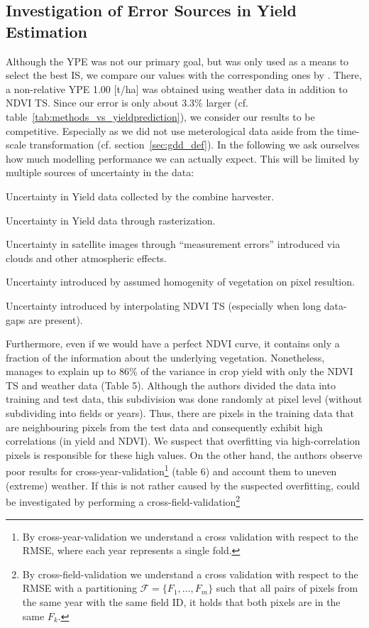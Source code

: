 {    \subsection{Investigation of Error Sources in Yield Estimation}{\label{sec:discuss_high-rmse-in-yield-prdiction}
        Although the YPE was not our primary goal, but was only used as a means to select the best IS, we compare our values with the corresponding ones by \cite{perichPixelbasedCropYield2022}. There, a non-relative YPE 1.00 [t/ha] was obtained using weather data in addition to NDVI TS. Since our error is only about 3.3\% larger (cf. table~\ref{tab:methods_vs_yieldprediction}), we consider our results to be competitive. Especially as we did not use meterological data aside from the time-scale transformation (cf. section~\ref{sec:gdd_def}). In the following we ask ourselves how much modelling performance we can actually expect. This will be limited by multiple sources of uncertainty in the data:
        \begin{Nenumerate}
            \item Uncertainty in Yield data collected by the combine harvester.
            \item Uncertainty in Yield data through rasterization.
            \item Uncertainty in satellite images through ``measurement errors'' introduced via clouds and other atmospheric effects.
            \item Uncertainty introduced by assumed homogenity of vegetation on pixel resultion. 
            \item Uncertainty introduced by interpolating NDVI TS (especially when long data-gaps are present).
        \end{Nenumerate}
        Furthermore, even if we would have a perfect NDVI curve, it contains only a fraction of the information about the underlying vegetation. 
        Nonetheless, \cite{perichPixelbasedCropYield2022} manages to explain up to 86\% of the variance in crop yield with only the NDVI TS and weather data (Table 5).  Although the authors divided the data into training and test data, this subdivision was done randomly at pixel level (without subdividing into fields or years). Thus, there are pixels in the training data that are neighbouring pixels from the test data and consequently exhibit high correlations (in yield and NDVI). We suspect that overfitting via high-correlation pixels is responsible for these high values. On the other hand, the authors observe poor results for cross-year-validation\footnote{By cross-year-validation we understand a cross validation with respect to the RMSE, where each year represents a single fold.} (table 6) and account them to uneven (extreme) weather.  If this is not rather caused by the suspected overfitting, could be investigated by performing a cross-field-validation\footnote{By cross-field-validation we understand a cross validation with respect to the RMSE with a partitioning $\mathcal{F}=\{F_1,\dots,F_m\}$ such that all pairs of pixels from the same year with the same field ID, it holds that both pixels are in the same $F_k$.} 
}}
